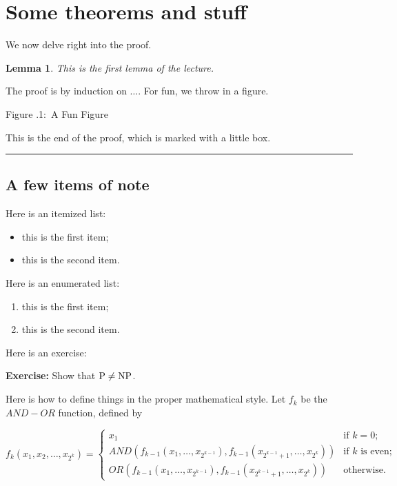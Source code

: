 \documentclass[twoside]{article}
\newcounter{lecnum}
\newcommand{\fig}[3]{
			\vspace{#2}
			\begin{center}
			Figure \thelecnum.#1:~#3
			\end{center}
	}
\newtheorem{lemma}[theorem]{Lemma}
\newenvironment{proof}{{\bf Proof:}}{\hfill\rule{2mm}{2mm}}
\begin{document}
\section{Some theorems and stuff}

We now delve right into the proof.

\begin{lemma}
This is the first lemma of the lecture.
\end{lemma}

\begin{proof}
The proof is by induction on $\ldots$.
For fun, we throw in a figure.
\fig{1}{1in}{A Fun Figure}

This is the end of the proof, which is marked with a little box.
\end{proof}

\subsection{A few items of note}

Here is an itemized list:
\begin{itemize}
\item this is the first item;
\item this is the second item.
\end{itemize}

Here is an enumerated list:
\begin{enumerate}
\item this is the first item;
\item this is the second item.
\end{enumerate}

Here is an exercise:

{\bf Exercise:}  Show that ${\rm P}\ne{\rm NP}$.

Here is how to define things in the proper mathematical style.
Let $f_k$ be the $AND-OR$ function, defined by

\[ f_k(x_1, x_2, \ldots, x_{2^k}) = \left\{ \begin{array}{ll}

	x_1 & \mbox{if $k = 0$;} \\

	AND(f_{k-1}(x_1, \ldots, x_{2^{k-1}}),
	   f_{k-1}(x_{2^{k-1} + 1}, \ldots, x_{2^k}))
	 & \mbox{if $k$ is even;} \\

	OR(f_{k-1}(x_1, \ldots, x_{2^{k-1}}),
	   f_{k-1}(x_{2^{k-1} + 1}, \ldots, x_{2^k}))	
	& \mbox{otherwise.} 
	\end{array}
	\right. \]
\end{document}
